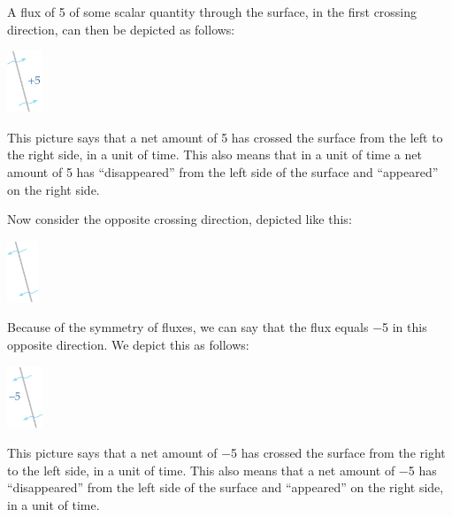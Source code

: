 \documentclass[a4paper,12pt,%
onecolumn,oneside,%
british%
]{memoir}
\renewcommand*{\|}[1][]{\nonscript\:#1\vert\nonscript\:\mathopen{}}
\begin{document}
A flux of \num{+5} of some scalar quantity through the surface, in the first crossing direction, can then be depicted as follows:\noprelistbreak
\begin{center}
  \medskip
  \includegraphics[height=5em]{images/flux_plus5c.pdf}
\end{center}
This picture says that a net amount of \num{5} has crossed the surface from the left to the right side, in a unit of time. This also means that in a unit of time a net amount of \num{5} has \enquote{disappeared} from the left side of the surface and \enquote{appeared} on the right side.

\medskip

Now consider the opposite crossing direction, depicted like this:\noprelistbreak
\begin{center}
  \medskip
  \includegraphics[height=5em]{images/surface_tilted_crossleft.pdf}
\end{center}
Because of the symmetry of fluxes, we can say that the flux equals \num{-5} in this opposite direction. We depict this as follows:\noprelistbreak
\begin{center}
  \medskip
  \includegraphics[height=5em]{images/flux_minus5c.pdf}
\end{center}
This picture says that a net amount of \num{-5} has crossed the surface from the right to the left side, in a unit of time. This also means that a net amount of \num{-5} has \enquote{disappeared} from the left side of the surface and \enquote{appeared} on the right side, in a unit of time.
\end{document}
